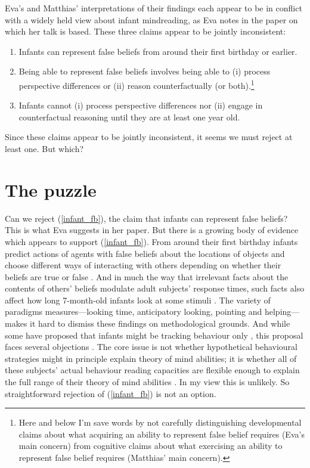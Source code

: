 \documentclass[12pt,\papersize]{extarticle}
\begin{document}
Eva's and Matthias' interpretations of their findings each appear to be in conflict with 
 a widely held view about infant mindreading, 
  as Eva notes in the paper on which her talk is based.
These three claims appear to be jointly inconsistent:
%
\begin{enumerate}
\item Infants can represent false beliefs from around their first birthday or earlier. \label{infant_fb}

\item  \label{fb_is_perspectives}  Being able to represent false beliefs involves being able to  (i) process perspective differences or (ii) reason counterfactually (or both).\footnote{
Here and below I'm save words by not carefully distinguishing 
 developmental claims about what acquiring an ability to represent false belief requires (Eva's main concern)
 from
 cognitive claims about what exercising an ability to represent false belief requires (Matthias' main concern).
}

\item Infants cannot (i) process perspective differences nor (ii) engage in counterfactual reasoning until they are at least one year old.  \label{infant_perspectives}

\end{enumerate}
%
Since these claims appear to be jointly inconsistent, it seems we must reject at least one.  But which?


\section{The puzzle}
Can we reject (\ref{infant_fb}), the claim that infants can represent false beliefs?  
This is what  Eva suggests in her paper.
But there is a growing body of evidence which appears to support  (\ref{infant_fb}).
From around their first birthday infants  predict actions of agents with false beliefs about the locations of objects \citep[]{en_1092, en_1208} and choose different ways of interacting with others depending on whether their beliefs are true or false \citep[]{en_1783,Knudsen:2011fk,southgate:2010fb}.  
And in much the way that irrelevant facts about the contents of others’ beliefs modulate adult subjects’ response times, such facts also affect how long 7-month-old infants look at some stimuli \citep[]{en_1821}.
The variety of paradigms measures---looking time, anticipatory looking, pointing and helping---makes it hard to dismiss these findings on methodological grounds.
And while some have proposed that infants might be tracking behaviour only \citet{en_1168, en_1169},
this proposal faces several objections \citep[e.g.][]{Song:2008qo}.
The core issue is not whether hypothetical behavioural strategies might in principle explain theory of mind abilities; it is whether all of these subjects’ actual behaviour reading capacities are flexible enough to explain the full range of their theory of mind abilities \citep[]{Apperly:2009ju}.
In my view this is unlikely.
So straightforward rejection of  (\ref{infant_fb}) is not an option.
\end{document}
